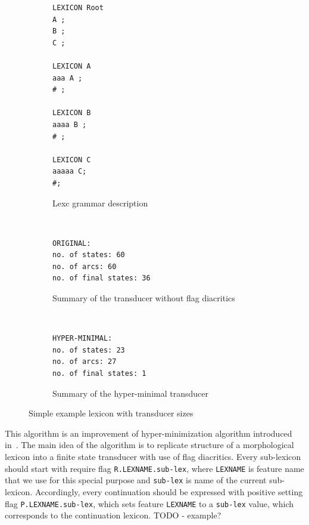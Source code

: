 \documentclass[11pt]{article}
\begin{document}
\begin{figure}[htbp]
    \centering

\begin{subfigure}[t]{0.3\textwidth}
\begin{verbatim}
LEXICON Root
A ;
B ;
C ;

LEXICON A
aaa A ;
# ;

LEXICON B
aaaa B ;
# ;

LEXICON C
aaaaa C;
#;
\end{verbatim}
\caption{Lexc grammar description
\label{fig:lexc-a2}}
\end{subfigure}
 ~ %
\begin{subfigure}[t]{0.3\textwidth}
\begin{verbatim}
ORIGINAL:
no. of states: 60
no. of arcs: 60
no. of final states: 36
\end{verbatim}
\caption{Summary of the transducer without flag diacritics
\label{fig:sizes-orig}}
\end{subfigure}%
 ~ %
\begin{subfigure}[t]{0.3\textwidth}
\begin{verbatim}
HYPER-MINIMAL:
no. of states: 23
no. of arcs: 27
no. of final states: 1
\end{verbatim}
\caption{Summary of the hyper-minimal transducer
\label{fig:sizes-flags}}
 \end{subfigure}

 \caption{Simple example lexicon with transducer sizes}
 \label{fig:simple-ex}
\end{figure}


This algorithm is an improvement of hyper-minimization algorithm introduced in~. The main idea of the algorithm is to 
replicate structure of a morphological lexicon into a finite state transducer with use of flag diacritics. Every sub-lexicon should start 
with require flag \verb+R.LEXNAME.sub-lex+, where \verb+LEXNAME+ is feature name that we use for this special purpose
and \verb+sub-lex+ is name of the current sub-lexicon. Accordingly, every continuation should be expressed with positive setting flag 
\verb+P.LEXNAME.sub-lex+, which sets feature \verb+LEXNAME+ to a \verb+sub-lex+ value, which corresponds to the continuation lexicon.
TODO - example?
\end{document}
